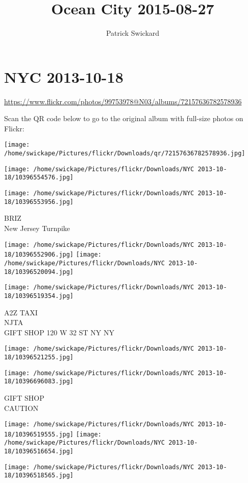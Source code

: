 \documentclass[10pt,letterpaper]{article}
\title{Ocean City 2015-08-27}
\author{Patrick Swickard}
\date{}
\begin{document}
\section*{NYC 2013-10-18}

\url{https://www.flickr.com/photos/99753978@N03/albums/72157636782578936}

Scan the QR code below to go to the original album with full-size photos on Flickr:

\texttt{[image: /home/swickape/Pictures/flickr/Downloads/qr/72157636782578936.jpg]}
\pagebreak

\texttt{[image: /home/swickape/Pictures/flickr/Downloads/NYC 2013-10-18/10396554576.jpg]}

\vspace{0.25in}
\texttt{[image: /home/swickape/Pictures/flickr/Downloads/NYC 2013-10-18/10396553956.jpg]}

BRIZ\\
New Jersey Turnpike
\pagebreak

\texttt{[image: /home/swickape/Pictures/flickr/Downloads/NYC 2013-10-18/10396552906.jpg]}
\texttt{[image: /home/swickape/Pictures/flickr/Downloads/NYC 2013-10-18/10396520094.jpg]}

\vspace{0.25in}
\texttt{[image: /home/swickape/Pictures/flickr/Downloads/NYC 2013-10-18/10396519354.jpg]}

A2Z TAXI\\
NJTA\\
GIFT SHOP 120 W 32 ST NY NY
\pagebreak

\texttt{[image: /home/swickape/Pictures/flickr/Downloads/NYC 2013-10-18/10396521255.jpg]}

\vspace{0.25in}
\texttt{[image: /home/swickape/Pictures/flickr/Downloads/NYC 2013-10-18/10396696083.jpg]}

GIFT SHOP\\
CAUTION
\pagebreak

\texttt{[image: /home/swickape/Pictures/flickr/Downloads/NYC 2013-10-18/10396519555.jpg]}
\texttt{[image: /home/swickape/Pictures/flickr/Downloads/NYC 2013-10-18/10396516654.jpg]}

\vspace{0.25in}
\texttt{[image: /home/swickape/Pictures/flickr/Downloads/NYC 2013-10-18/10396518565.jpg]}
\end{document}
